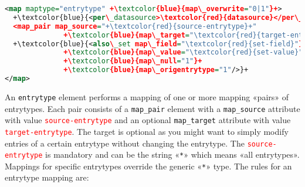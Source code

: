 \documentclass{ltxdockit}
\begin{document}

\lstset{showspaces=false,showstringspaces=false}
\begin{lstlisting}[language=xml,escapechar=+,mathescape=true]
<map maptype="entrytype" +\textcolor{blue}{map\_overwrite="0|1"}+>
  +\textcolor{blue}{<per\_datasource>\textcolor{red}{datasource}</per\_datasource>}+
  <map_pair map_source="+\textcolor{red}{source-entrytype}+"
              +\textcolor{blue}{map\_target="\textcolor{red}{target-entrytype}"}+/>
  +\textcolor{blue}{<also\_set map\_field="\textcolor{red}{set-field}"}+
              +\textcolor{blue}{map\_value="\textcolor{red}{set-value}"}+
              +\textcolor{blue}{map\_null="1"}+
              +\textcolor{blue}{map\_origentrytype="1"/>}+
</map>
\end{lstlisting}

\noindent An \verb+entrytype+ element performs a mapping of one or more
mapping «pairs» of entrytypes. Each pair consists of a \verb+map_pair+
element with a \verb+map_source+ attribute with value
\textcolor{red}{\texttt{source-entrytype}} and an optional
\verb+map_target+ attribute with value
\textcolor{red}{\texttt{target-entrytype}}. The target is
optional as you might want to simply modify entries of a certain entrytype
without changing the entrytype. The
\textcolor{red}{\texttt{source-entrytype}} is mandatory and can be the
string «\verb+*+» which means «all entrytypes». Mappings for specific
entrytypes override the generic «\verb+*+» type. The
rules for an entrytype mapping are:\\[1ex]
\end{document}
